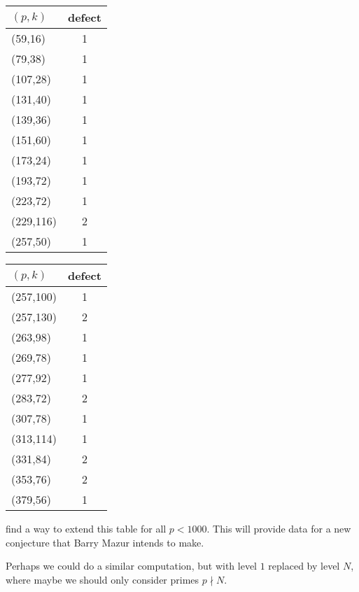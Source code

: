 \documentclass{article}
\begin{document}
\begin{center}
\begin{tabular}{|l|c|}\hline
$(p,k)$&{\bf defect}\\\hline
(59,16)&1\\
(79,38)&1\\
(107,28)&1\\
(131,40)&1\\
(139,36)&1\\
(151,60)&1\\
(173,24)&1\\
(193,72)&1\\
(223,72)&1\\
(229,116)&2\\
(257,50)&1\\
\hline\end{tabular}
\begin{tabular}{|l|c|}\hline
$(p,k)$&{\bf defect}\\\hline
(257,100)&1\\
(257,130)&2\\
(263,98)&1\\
(269,78)&1\\
(277,92)&1\\
(283,72)&2\\
(307,78)&1\\
(313,114)&1\\
(331,84)&2\\
(353,76)&2\\
(379,56)&1\\
\hline\end{tabular}
\end{center}

\vspace{1em}
 find a way to extend this table for all $p<1000$.
This will provide data for a new conjecture that Barry Mazur intends to make.
\vspace{1em}



\begin{remark} Perhaps we could do a similar computation, but with level
$1$ replaced by level $N$, where maybe we should only consider
primes $p\nmid N$.  
\end{remark}


\end{document}
